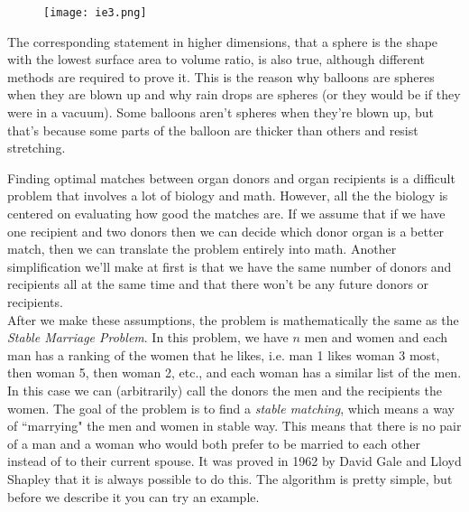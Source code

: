 \begin{figure}[H]
   \centering
   \texttt{[image: ie3.png]} 
\end{figure}

The corresponding statement in higher dimensions, that a sphere is the shape with the lowest surface area to volume ratio, is also true, although different methods are required to prove it. This is the reason why balloons are spheres when they are blown up and why rain drops are spheres (or they would be if they were in a vacuum). Some balloons aren't spheres when they're blown up, but that's because some parts of the balloon are thicker than others and resist stretching. \\


Finding optimal matches between organ donors and organ recipients is a difficult problem that involves a lot of biology and math. However, all the the biology is centered on evaluating how good the matches are. If we assume that if we have one recipient and two donors then we can decide which donor organ is a better match, then we can translate the problem entirely into math. Another simplification we'll make at first is that we have the same number of donors and recipients all at the same time and that there won't be any future donors or recipients. \\

After we make these assumptions, the problem is mathematically the same as the \emph{Stable Marriage Problem}. In this problem, we have $n$ men and women and each man has a ranking of the women that he likes, i.e. man 1 likes woman 3 most, then woman 5, then woman 2, etc., and each woman has a similar list of the men. In this case we can (arbitrarily) call the donors the men and the recipients the women. The goal of the problem is to find a \emph{stable matching}, which means a way of ``marrying" the men and women in stable way. This means that there is no pair of a man and a woman who would both prefer to be married to each other instead of to their current spouse. It was proved in 1962 by David Gale and Lloyd Shapley that it is always possible to do this. The algorithm is pretty simple, but before we describe it you can try an example. \\

 \vspace{0.2cm}

